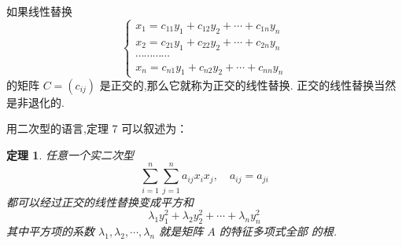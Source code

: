 \documentclass[13pt]{beamer}
\newtheorem{thm}{定理}
\begin{document}
\begin{frame}
\small{如果线性替换
\[
\left\{\begin{array}{l}
x_{1}=c_{11} y_{1}+c_{12} y_{2}+\cdots+c_{1 n} y_{n} \\
x_{2}=c_{21} y_{1}+c_{22} y_{2}+\cdots+c_{2 n} y_{n} \\
\cdots \cdots \cdots \cdots \\
x_{n}=c_{n 1} y_{1}+c_{n 2} y_{2}+\cdots+c_{n n} y_{n}
\end{array}\right.
\]
的矩阵 ${C}=\left(c_{i j}\right)$ 是正交的,那么它就称为正交的线性替换.
正交的线性替换当然是非退化的. 

用二次型的语言,定理 7 可以叙述为： 
\begin{thm}
任意一个实二次型
\[
\sum_{i=1}^{n} \sum_{j=1}^{n} a_{i j} x_{i} x_{j},  \quad  a_{i j}=a_{j i}
\]
都可以经过正交的线性替换变成平方和
\[
\lambda_{1} y_{1}^{2}+\lambda_{2} y_{2}^{2}+\cdots+\lambda_{n} y_{n}^{2}
\]
其中平方项的系数 $\lambda_{1}, \lambda_{2}, \cdots, \lambda_{n}$ 就是矩阵 ${A}$ 的特征多项式全部 的根. 
\end{thm}
}
\end{frame}
\end{document}
